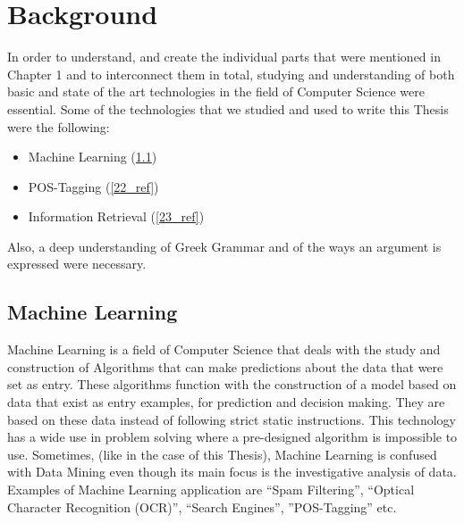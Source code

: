 \chapter{Background}
In order to understand, and create the individual parts that were mentioned in Chapter 1 and to interconnect them in total, studying and understanding of both basic and state of the art technologies in the field of Computer Science were essential. Some of the technologies that we studied and used to write this Thesis were the following:\\
\begin{itemize}

	\item Machine Learning (\ref{21_ref})
	\item POS-Tagging (\ref{22_ref})
	\item Information Retrieval (\ref{23_ref})\\

\end{itemize}
Also, a deep understanding of Greek Grammar and of the ways an argument is expressed were necessary.

\section{Machine Learning}\label{21_ref}
Machine Learning is a field of Computer Science that deals with the study and construction of Algorithms that can make predictions about the data that were set as entry. These algorithms function with the construction of a model based on data that exist as entry examples, for prediction and decision making. They are based on these data instead of following strict static instructions. This technology has a wide use in problem solving where a pre-designed algorithm is impossible to use. Sometimes, (like in the case of this Thesis), Machine Learning is confused with Data Mining even though its main focus is the investigative analysis of data. Examples of Machine Learning application are ``Spam Filtering'', ``Optical Character Recognition (OCR)'', ``Search Engines'', ''POS-Tagging'' etc.

